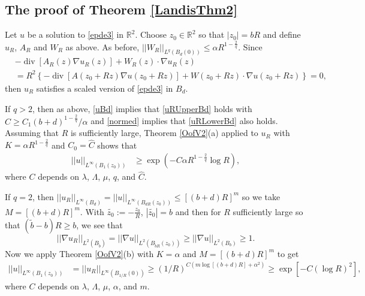 \documentclass[12pt,reqno]{amsart}
\theoremstyle{plain}
\theoremstyle{definition}
\newcommand{\disp}{\displaystyle}
\DeclareMathOperator{\di}{div}
\newcommand{\al}{\alpha}
\newcommand{\la}{\lambda}
\newcommand{\La}{\Lambda}
\newcommand{\iny}{\infty}
\newcommand{\gr}{\nabla}
\newcommand{\norm}[1]{\left\vert \left\vert #1\right\vert\right\vert}
\newcommand{\abs}[1]{\left\vert#1\right\vert}
\newcommand{\set}[1]{\left\{#1\right\}}
\newcommand{\brac}[1]{\left[#1\right]}
\newcommand{\pr}[1]{\left( #1 \right) }
\newcommand{\R}{\ensuremath{\mathbb{R}}}
\begin{document}
\subsection{The proof of Theorem \ref{LandisThm2}}

Let $u$ be a solution to \eqref{epde3} in $\R^2$.
Choose $z_0 \in \R^2$ so that $\abs{z_0} = b R$ and define $u_R$, $A_R$ and $W_R$ as above.
As before, $\disp \norm{W_{R}}_{L^{q}\pr{B_d\pr{0}}}  \le \al R^{1 - \frac 2 {q}}$.
Since
\begin{align*}
& - \di\brac{ A_R\pr{z} \gr u_R\pr{z}} + W_{R}\pr{z} \cdot \gr u_R\pr{z}   \\
&= R^2 \set{- \di\brac{ A\pr{z_0 + Rz} \gr u\pr{z_0 + Rz}} + W\pr{z_0 + Rz} \cdot \gr u\pr{z_0 + Rz}} 
= 0,
\end{align*}
then $u_R$ satisfies a scaled version of \eqref{epde3} in $B_{d}$.

If $q > 2$, then as above, \eqref{uBd} implies that \eqref{uRUpperBd} holds with $\hat C \ge C_1 \pr{b + d}^{1 - \frac 2 {q}}/\al$ and \eqref{normed} implies that \eqref{uRLowerBd} also holds.
Assuming that $R$ is sufficiently large, Theorem \ref{OofV2}(a) applied to $u_R$ with $K = \al R^{1 - \frac {2}{q}}$ and $C_0 = \hat C$ shows that
\begin{align*}
\norm{u}_{L^\iny\pr{{B_{1}(z_0)}}} 
&\ge \exp\pr{- C {\al R^{1 - \frac {2}{q}}} \log R },
\end{align*}
where $C$ depends on $\la$, $\La$, $\mu$, $q$, and $\hat C$.

If $q = 2$, then $\disp \norm{u_R}_{L^\iny\pr{B_{d}}} = \norm{u}_{L^\iny\pr{B_{dR}\pr{z_0}}} \le \brac{\pr{b + d}R}^m$ so we take $M = \brac{\pr{b + d}R}^m$.
With $\disp\widetilde{z_0} := - \frac {z_0}{R} $, $\disp\abs{\widetilde{z_0}} = b$ and then for $R$ sufficiently large so that $\pr{\tilde b -b}R \ge b$, we see that
$$\norm{\gr u_R}_{L^2\pr{B_{\tilde b}}} = \norm{\gr u}_{L^2\pr{B_{\tilde bR}\pr{z_0}}} \ge \norm{\gr u}_{L^2\pr{B_{b}}}  \ge 1.$$
Now we apply Theorem \ref{OofV2}(b) with $K = \al$ and $M = \brac{\pr{b + d}R}^m$ to get
\begin{align*}
\norm{u}_{L^\iny\pr{B_1\pr{z_0}}}
&= \norm{u_R}_{L^\iny\pr{B_{1/R}\pr{0}}}
\ge \pr{1/R}^{C\pr{m\log \brac{\pr{b + d}R} + \al^2}}
\ge \exp\brac{- C \pr{\log R}^2},
\end{align*}
where $C$ depends on $\la$, $\La$, $\mu$, $\al$, and $m$.
\end{document}
